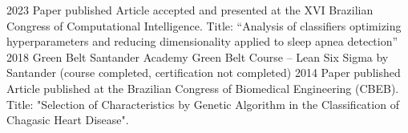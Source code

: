 \documentclass[9pt]{developercv} %
\begin{document}
	\begin{entrylist}
		\entry
		{2023}
		{Paper published}
		{}
		{%
			Article accepted and presented at the XVI Brazilian Congress of Computational Intelligence. Title: “Analysis of classifiers optimizing hyperparameters and reducing dimensionality applied to sleep apnea detection”}
		\entry
		{2018}
		{Green Belt}
		{Santander Academy}
		{%
			Green Belt Course – Lean Six Sigma by Santander (course completed, certification not completed)}
		\entry
		{2014}
		{Paper published}
		{}
		{%
			Article published at the Brazilian Congress of Biomedical Engineering (CBEB). Title: "Selection of Characteristics by Genetic Algorithm in the Classification of Chagasic Heart Disease".}
	\end{entrylist}
	
	
	
\end{document}
